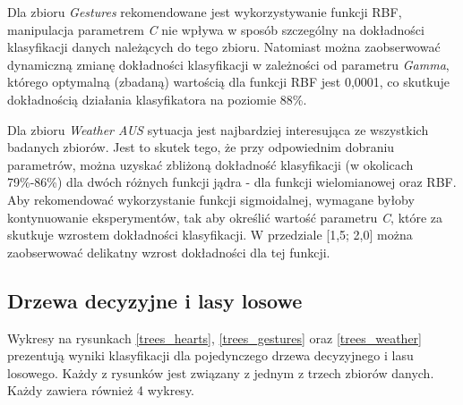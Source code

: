 \documentclass{classrep}
\begin{document}
{{            Dla zbioru \textit{Gestures} \cite{dataset_gestures} rekomendowane jest
            wykorzystywanie funkcji RBF, manipulacja parametrem \emph{C} nie wpływa w
            sposób szczególny na dokładności klasyfikacji danych należących do tego
            zbioru. Natomiast można zaobserwować dynamiczną zmianę dokładności
            klasyfikacji w zależności od parametru \emph{Gamma}, którego optymalną
            (zbadaną) wartością dla funkcji RBF jest 0,0001, co skutkuje dokładnością
            działania klasyfikatora na poziomie 88\%.

            Dla zbioru \textit{Weather AUS} \cite{dataset_weather_aus} sytuacja jest
            najbardziej interesująca ze wszystkich badanych zbiorów. Jest to skutek
            tego, że przy odpowiednim dobraniu parametrów, można uzyskać zbliżoną
            dokładność klasyfikacji (w okolicach 79\%-86\%) dla dwóch różnych funkcji
            jądra - dla funkcji wielomianowej oraz RBF. Aby rekomendować wykorzystanie
            funkcji sigmoidalnej, wymagane byłoby kontynuowanie eksperymentów, tak aby
            określić wartość parametru \emph{C}, które za skutkuje wzrostem dokładności
            klasyfikacji. W przedziale [1,5; 2,0] można zaobserwować delikatny wzrost
            dokładności dla tej funkcji.
        }

        \subsection{Drzewa decyzyjne i lasy losowe}
        \label{drzewa_decyzyjne_summary} {
            Wykresy na rysunkach \ref{trees_hearts}, \ref{trees_gestures} oraz
            \ref{trees_weather} prezentują wyniki klasyfikacji dla pojedynczego drzewa
            decyzyjnego i lasu losowego. Każdy z rysunków jest związany z jednym z
            trzech zbiorów danych. Każdy zawiera również 4 wykresy.

}}
\end{document}
